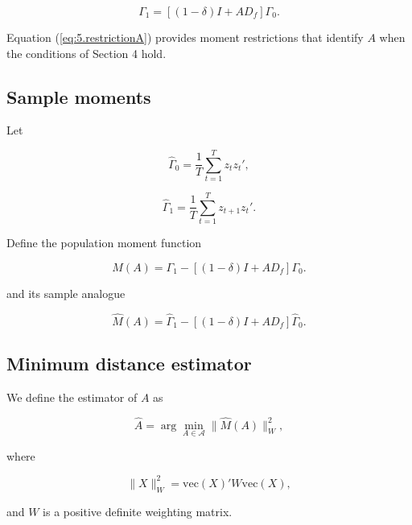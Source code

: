 \documentclass[12pt]{article}
\numberwithin{equation}{section}
\begin{document}
\begin{equation}
\Gamma_1
=
[(1-\delta) I + A D_f] \Gamma_0.
\label{eq:5.restrictionA}
\end{equation}

Equation (\ref{eq:5.restrictionA}) provides moment restrictions that identify
$A$ when the conditions of Section 4 hold.

\subsection{Sample moments}

Let

\begin{equation}
\hat \Gamma_0
=
\frac{1}{T}
\sum_{t=1}^T
z_t z_t',
\label{eq:5.gamma0hat}
\end{equation}

\begin{equation}
\hat \Gamma_1
=
\frac{1}{T}
\sum_{t=1}^T
z_{t+1} z_t'.
\label{eq:5.gamma1hat}
\end{equation}

Define the population moment function

\begin{equation}
M(A)
=
\Gamma_1
-
[(1-\delta) I + A D_f] \Gamma_0.
\label{eq:5.M}
\end{equation}

and its sample analogue

\begin{equation}
\hat M(A)
=
\hat \Gamma_1
-
[(1-\delta) I + A D_f] \hat \Gamma_0.
\label{eq:5.Mhat}
\end{equation}

\subsection{Minimum distance estimator}

We define the estimator of $A$ as

\begin{equation}
\hat A
=
\arg\min_{A \in \mathcal A}
\|
\hat M(A)
\|_W^2,
\label{eq:5.estimator}
\end{equation}

where

\begin{equation}
\|X\|_W^2
=
\mathrm{vec}(X)'
W
\mathrm{vec}(X),
\label{eq:5.norm}
\end{equation}

and $W$ is a positive definite weighting matrix.
\end{document}
